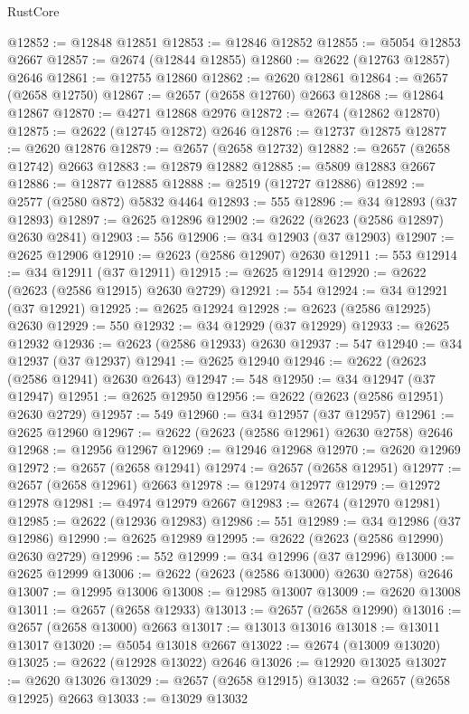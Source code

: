 \begin{lexlean}{RustCore}
\begin{coremodule}
@12852 := @12848 @12851
@12853 := @12846 @12852
@12855 := @5054 @12853 @2667
@12857 := @2674 (@12844 @12855)
@12860 := @2622 (@12763 @12857) @2646
@12861 := @12755 @12860
@12862 := @2620 @12861
@12864 := @2657 (@2658 @12750)
@12867 := @2657 (@2658 @12760) @2663
@12868 := @12864 @12867
@12870 := @4271 @12868 @2976
@12872 := @2674 (@12862 @12870)
@12875 := @2622 (@12745 @12872) @2646
@12876 := @12737 @12875
@12877 := @2620 @12876
@12879 := @2657 (@2658 @12732)
@12882 := @2657 (@2658 @12742) @2663
@12883 := @12879 @12882
@12885 := @5809 @12883 @2667
@12886 := @12877 @12885
@12888 := @2519 (@12727 @12886)
@12892 := @2577 (@2580 @872) @5832 @4464
@12893 := 555
@12896 := @34 @12893 (@37 @12893)
@12897 := @2625 @12896
@12902 := @2622 (@2623 (@2586 @12897) @2630 @2841)
@12903 := 556
@12906 := @34 @12903 (@37 @12903)
@12907 := @2625 @12906
@12910 := @2623 (@2586 @12907) @2630
@12911 := 553
@12914 := @34 @12911 (@37 @12911)
@12915 := @2625 @12914
@12920 := @2622 (@2623 (@2586 @12915) @2630 @2729)
@12921 := 554
@12924 := @34 @12921 (@37 @12921)
@12925 := @2625 @12924
@12928 := @2623 (@2586 @12925) @2630
@12929 := 550
@12932 := @34 @12929 (@37 @12929)
@12933 := @2625 @12932
@12936 := @2623 (@2586 @12933) @2630
@12937 := 547
@12940 := @34 @12937 (@37 @12937)
@12941 := @2625 @12940
@12946 := @2622 (@2623 (@2586 @12941) @2630 @2643)
@12947 := 548
@12950 := @34 @12947 (@37 @12947)
@12951 := @2625 @12950
@12956 := @2622 (@2623 (@2586 @12951) @2630 @2729)
@12957 := 549
@12960 := @34 @12957 (@37 @12957)
@12961 := @2625 @12960
@12967 := @2622 (@2623 (@2586 @12961) @2630 @2758) @2646
@12968 := @12956 @12967
@12969 := @12946 @12968
@12970 := @2620 @12969
@12972 := @2657 (@2658 @12941)
@12974 := @2657 (@2658 @12951)
@12977 := @2657 (@2658 @12961) @2663
@12978 := @12974 @12977
@12979 := @12972 @12978
@12981 := @4974 @12979 @2667
@12983 := @2674 (@12970 @12981)
@12985 := @2622 (@12936 @12983)
@12986 := 551
@12989 := @34 @12986 (@37 @12986)
@12990 := @2625 @12989
@12995 := @2622 (@2623 (@2586 @12990) @2630 @2729)
@12996 := 552
@12999 := @34 @12996 (@37 @12996)
@13000 := @2625 @12999
@13006 := @2622 (@2623 (@2586 @13000) @2630 @2758) @2646
@13007 := @12995 @13006
@13008 := @12985 @13007
@13009 := @2620 @13008
@13011 := @2657 (@2658 @12933)
@13013 := @2657 (@2658 @12990)
@13016 := @2657 (@2658 @13000) @2663
@13017 := @13013 @13016
@13018 := @13011 @13017
@13020 := @5054 @13018 @2667
@13022 := @2674 (@13009 @13020)
@13025 := @2622 (@12928 @13022) @2646
@13026 := @12920 @13025
@13027 := @2620 @13026
@13029 := @2657 (@2658 @12915)
@13032 := @2657 (@2658 @12925) @2663
@13033 := @13029 @13032

\end{coremodule}
\end{lexlean}
